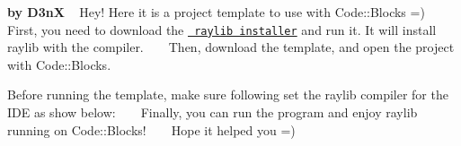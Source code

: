 {\bfseries{by D3nX}} ~\newline
 Hey! Here it is a project template to use with {\ttfamily Code\+::\+Blocks} =) ~\newline
~\newline
 First, you need to download the \href{https://www.raylib.com}{\texttt{ raylib installer}} and run it. It will install raylib with the compiler. ~\newline
~\newline
 Then, download the template, and open the project with {\ttfamily Code\+::\+Blocks}.

Before running the template, make sure following set the raylib compiler for the I\+DE as show below\+: ~\newline
  ~\newline
 Finally, you can run the program and enjoy raylib running on {\ttfamily Code\+::\+Blocks}! ~\newline
~\newline
 Hope it helped you =) 